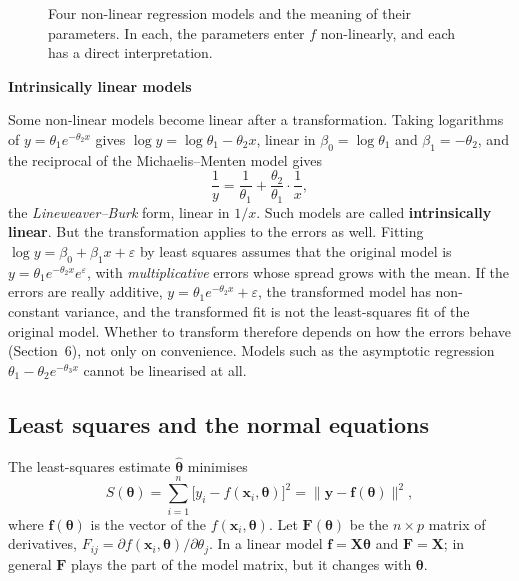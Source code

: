 \documentclass[11pt,a4paper]{article}
\numberwithin{equation}{section}
\theoremstyle{definition}
\newcommand{\subhead}[1]{%
  \par\medskip\noindent\textbf{#1}\par\nobreak\smallskip}
\begin{document}
\begin{figure}[H]
\caption{Four non-linear regression models and the meaning of their parameters. In each, the
parameters enter $f$ non-linearly, and each has a direct interpretation.}
\label{fig:nl-models}
\end{figure}

\subhead{Intrinsically linear models}
Some non-linear models become linear after a transformation. Taking logarithms of $y = \theta_1e^{-\theta_2x}$ gives
$\log y = \log\theta_1 - \theta_2x$, linear in $\beta_0 = \log\theta_1$ and $\beta_1 = -\theta_2$, and the reciprocal of the Michaelis--Menten model gives
\[
\frac1y = \frac{1}{\theta_1} + \frac{\theta_2}{\theta_1}\cdot\frac1x ,
\]
the \emph{Lineweaver--Burk} form, linear in $1/x$. Such models are called \textbf{intrinsically linear}. But the
transformation applies to the errors as well. Fitting $\log y = \beta_0 + \beta_1x + \varepsilon$ by least squares assumes that the
original model is $y = \theta_1e^{-\theta_2x}e^{\varepsilon}$, with \emph{multiplicative} errors whose spread grows with the mean. If the
errors are really additive, $y = \theta_1e^{-\theta_2x} + \varepsilon$, the transformed model has non-constant variance, and the
transformed fit is not the least-squares fit of the original model. Whether to transform therefore depends
on how the errors behave (Section~6), not only on convenience. Models such as the asymptotic regression
$\theta_1 - \theta_2e^{-\theta_3x}$ cannot be linearised at all.

\subsection{Least squares and the normal equations}
The least-squares estimate $\hat{\boldsymbol\theta}$ minimises
\[
S(\boldsymbol\theta) = \sum_{i=1}^n\bigl[y_i - f(\mathbf{x}_i, \boldsymbol\theta)\bigr]^2 = \bigl\|\mathbf{y} - \mathbf{f}(\boldsymbol\theta)\bigr\|^2 ,
\]
where $\mathbf{f}(\boldsymbol\theta)$ is the vector of the $f(\mathbf{x}_i, \boldsymbol\theta)$. Let $\mathbf{F}(\boldsymbol\theta)$ be the $n \times p$ matrix of derivatives,
$F_{ij} = \partial f(\mathbf{x}_i, \boldsymbol\theta)/\partial\theta_j$. In a linear model $\mathbf{f} = \mathbf{X}\boldsymbol\theta$ and $\mathbf{F} = \mathbf{X}$; in general $\mathbf{F}$ plays the part of the model
matrix, but it changes with $\boldsymbol\theta$.
\end{document}
